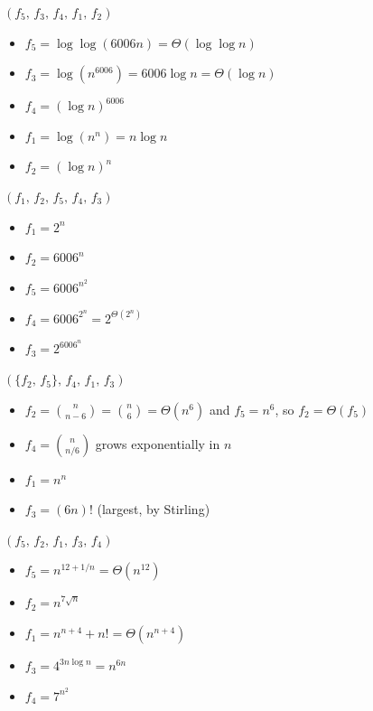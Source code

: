 \documentclass[12pt,twoside]{article}
\begin{document}


\begin{problems}

\problem  %

\begin{problemparts}
\problempart %
$(f_5,\, f_3,\, f_4,\, f_1,\, f_2)$
\begin{itemize}
    \item $f_5 = \log\log(6006n) = \Theta(\log\log n)$
    \item $f_3 = \log(n^{6006}) = 6006\log n = \Theta(\log n)$
    \item $f_4 = (\log n)^{6006}$
    \item $f_1 = \log(n^n) = n\log n$
    \item $f_2 = (\log n)^n$
\end{itemize}

\problempart %
$(f_1,\, f_2,\, f_5,\, f_4,\, f_3)$
\begin{itemize}
    \item $f_1 = 2^n$
    \item $f_2 = 6006^n$
    \item $f_5 = 6006^{n^2}$
    \item $f_4 = 6006^{2^n} = 2^{\Theta(2^n)}$
    \item $f_3 = 2^{6006^n}$
\end{itemize}

\problempart %
$(\{f_2,\, f_5\},\, f_4,\, f_1,\, f_3)$
\begin{itemize}
    \item $f_2 = \binom{n}{n-6} = \binom{n}{6} = \Theta(n^6)$ and $f_5 = n^6$, so $f_2 = \Theta(f_5)$
    \item $f_4 = \binom{n}{n/6}$ grows exponentially in $n$
    \item $f_1 = n^n$
    \item $f_3 = (6n)!$ (largest, by Stirling)
\end{itemize}

\problempart %
$(f_5,\, f_2,\, f_1,\, f_3,\, f_4)$
\begin{itemize}
    \item $f_5 = n^{12+1/n} = \Theta(n^{12})$
    \item $f_2 = n^{7\sqrt{n}}$
    \item $f_1 = n^{n+4} + n! = \Theta(n^{n+4})$
    \item $f_3 = 4^{3n\log n} = n^{6n}$
    \item $f_4 = 7^{n^2}$
\end{itemize}
\end{problemparts}


\end{problems}
\end{document}
